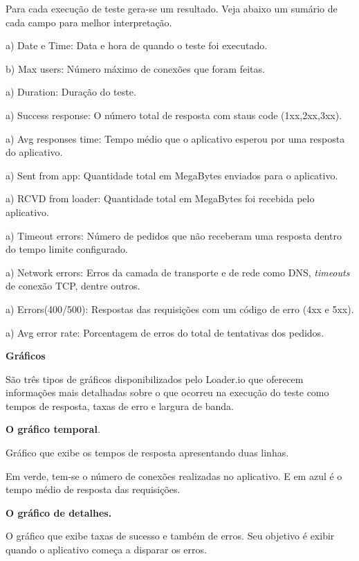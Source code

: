   Para cada execução de teste gera-se um resultado. Veja abaixo um sumário de cada campo para melhor interpretação.
  
  \begin{compactitem}
    \item[a)] Date e Time: Data e hora de quando o teste foi executado.
    \item[b)] Max users: Número máximo de conexões que foram feitas.
    \item[a)] Duration:  Duração do teste.
    \item[a)] Success response: O número total de resposta com staus code (1xx,2xx,3xx).
    \item[a)] Avg responses time: Tempo médio que o aplicativo esperou por uma resposta do aplicativo.
    \item[a)] Sent from app: Quantidade total em MegaBytes enviados para o aplicativo.
    \item[a)] RCVD from loader: Quantidade total em MegaBytes foi recebida pelo aplicativo.
    \item[a)] Timeout errors: Número de pedidos que não receberam uma resposta dentro do tempo limite configurado.
    \item[a)] Network errors: Erros da camada de transporte e de rede como \ac{DNS}, \textit{timeouts} de conexão TCP, dentre outros.
    \item[a)] Errors(400/500): Respostas das requisições com um código de erro (4xx e 5xx).
    \item[a)] Avg error rate: Porcentagem de erros do total de tentativas dos pedidos.
  \end{compactitem}

  \textbf{Gráficos}
  
  São três tipos de gráficos disponibilizados pelo Loader.io que oferecem informações mais detalhadas 
  sobre o que ocorreu na execução do teste como tempos de resposta, taxas de erro e largura de banda.
  
  \textbf{O gráfico temporal}.
  
  Gráfico que exibe os tempos de resposta apresentando duas linhas.
  
  Em verde, tem-se o número de conexões realizadas no aplicativo. E em azul é o tempo médio de resposta das
  requisições.
  
  \textbf{O gráfico de detalhes.}
  
  O gráfico que exibe taxas de sucesso e também de erros. Seu objetivo é exibir quando o aplicativo
  começa a disparar os erros.
  
